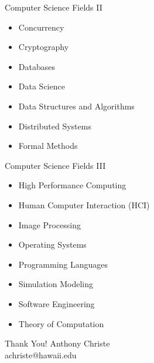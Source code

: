 \documentclass{beamer}
\begin{document}
\begin{frame}{Computer Science Fields II}
\begin{itemize}
	\item Concurrency
	\item Cryptography
	\item Databases
	\item Data Science
	\item Data Structures and Algorithms
	\item Distributed Systems
	\item Formal Methods
\end{itemize}
\end{frame}

\begin{frame}{Computer Science Fields III}
\begin{itemize}

	\item High Performance Computing
	\item Human Computer Interaction (HCI)
	\item Image Processing
	\item Operating Systems
	\item Programming Languages
	\item Simulation Modeling
	\item Software Engineering
	\item Theory of Computation
\end{itemize}
\end{frame}

\begin{frame}{Thank You!}
Anthony Christe \\
achriste@hawaii.edu
\end{frame}
\end{document}
